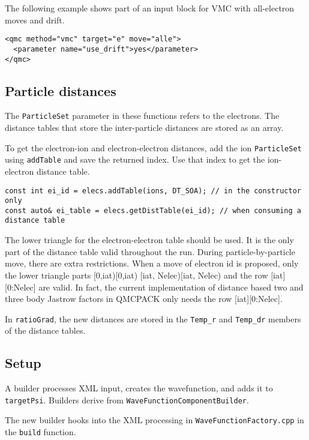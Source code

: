 The following example shows part of an input block for VMC with all-electron moves and drift.

\begin{verbatim}
<qmc method="vmc" target="e" move="alle">
  <parameter name="use_drift">yes</parameter>
</qmc>
\end{verbatim}



\subsection{Particle distances}

The \texttt{ParticleSet} parameter in these functions refers to the electrons.
The distance tables that store the inter-particle distances are stored as an array.

To get the electron-ion and electron-electron distances, add the ion \texttt{ParticleSet} using \texttt{addTable}
and save the returned index. Use that index to get the ion-electron distance table.
\begin{verbatim}
const int ei_id = elecs.addTable(ions, DT_SOA); // in the constructor only
const auto& ei_table = elecs.getDistTable(ei_id); // when consuming a distance table
\end{verbatim}

The lower triangle for the electron-electron table should be used.
It is the only part of the distance table valid throughout the run.
During particle-by-particle move, there are extra restrictions.
When a move of electron id is proposed, only the lower triangle parts [0,iat)[0,iat) [iat, Nelec)[iat, Nelec) and the row [iat][0:Nelec] are valid.
In fact, the current implementation of distance based two and three body Jastrow factors in QMCPACK only needs the row [iat][0:Nelec].

In \texttt{ratioGrad}, the new distances are stored in the \texttt{Temp\_r} and \texttt{Temp\_dr}
members of the distance tables.

\subsection{Setup}

A builder processes XML input, creates the wavefunction, and adds it to \texttt{targetPsi}.
Builders derive from \texttt{WaveFunctionComponentBuilder}.

The new builder hooks into the XML processing in \texttt{WaveFunctionFactory.cpp} in the \texttt{build} function.


